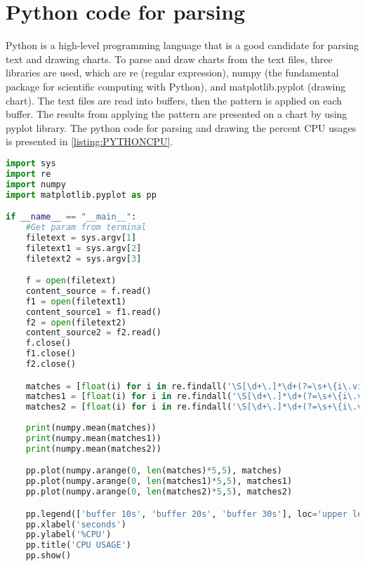 \section{Python code for parsing}
Python is a high-level programming language that is a good candidate for parsing text and drawing charts. To parse and draw charts from the text files, three libraries are used, which are re (regular expression), numpy (the fundamental package for scientific computing with Python), and matplotlib.pyplot (drawing chart). The text files are read into buffers, then the pattern is applied on each buffer. The results from applying the pattern are presented on a chart by using pyplot library. The python code for parsing and drawing the percent CPU usages is presented in \ref{listing:PYTHONCPU}.
\begin{minipage}{\linewidth}
\begin{lstlisting}[caption={Python code for parsing CPU usage}, label = {listing:PYTHONCPU}, language = python ,captionpos=b, basicstyle=\ttfamily\footnotesize]
import sys
import re
import numpy
import matplotlib.pyplot as pp

if __name__ == "__main__":
    #Get param from terminal
    filetext = sys.argv[1]
    filetext1 = sys.argv[2]
    filetext2 = sys.argv[3]

    f = open(filetext)
    content_source = f.read()
    f1 = open(filetext1)
    content_source1 = f1.read()
    f2 = open(filetext2)
    content_source2 = f2.read()
    f.close()
    f1.close()
    f2.close()

    matches = [float(i) for i in re.findall('\S[\d+\.]*\d+(?=\s+\{i\.viettt)', content_source, re.DOTALL)]
    matches1 = [float(i) for i in re.findall('\S[\d+\.]*\d+(?=\s+\{i\.viettt)', content_source1, re.DOTALL)]
    matches2 = [float(i) for i in re.findall('\S[\d+\.]*\d+(?=\s+\{i\.viettt)', content_source2, re.DOTALL)]
    
    print(numpy.mean(matches))
    print(numpy.mean(matches1))
    print(numpy.mean(matches2))

    pp.plot(numpy.arange(0, len(matches)*5,5), matches)
    pp.plot(numpy.arange(0, len(matches1)*5,5), matches1)
    pp.plot(numpy.arange(0, len(matches2)*5,5), matches2)

    pp.legend(['buffer 10s', 'buffer 20s', 'buffer 30s'], loc='upper left')
    pp.xlabel('seconds')
    pp.ylabel('%CPU')
    pp.title('CPU USAGE')
    pp.show()
\end{lstlisting}
\end{minipage}
